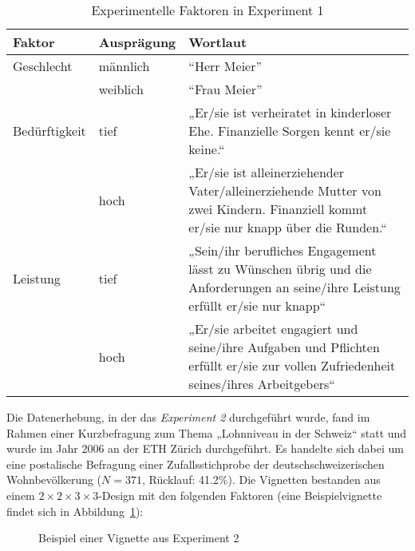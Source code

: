 \documentclass[a4paper,12pt]{article}
\renewcommand{\baselinestretch}{1.1}
\newif\ifcomments
\newcommand{\comment}[1]{%
    \ifcomments\marginpar{\renewcommand{\baselinestretch}{1}\tiny\hspace*{-1.1em}\colorbox{gray!20}%
    {\textcolor{red}{\parbox[t]{.9in}{\raggedright #1}}}}\fi}
\begin{document}
\begin{table}
    \small
    \caption{Experimentelle Faktoren in Experiment 1}\label{tab-ex1-faktoren}
    \begin{tabularx}{\textwidth}{@{}llX@{}}
        \toprule
        Faktor          & Ausprägung & Wortlaut       \\\midrule
        Geschlecht      & männlich     & “Herr Meier”   \\
                        & weiblich     & “Frau Meier”   \\
        \addlinespace
        Bedürftigkeit   & tief         & „Er/sie ist verheiratet in kinderloser Ehe. Finanzielle Sorgen kennt er/sie keine.“ \\
                        & hoch         & „Er/sie ist alleinerziehender Vater/alleinerziehende Mutter von zwei Kindern. Finanziell kommt er/sie nur knapp über die Runden.“ \\
        \addlinespace
        Leistung        & tief         & „Sein/ihr berufliches Engagement lässt zu Wünschen übrig und die Anforderungen an seine/ihre Leistung erfüllt er/sie nur knapp“   \\
                        & hoch         & „Er/sie arbeitet engagiert und seine/ihre Aufgaben und Pflichten erfüllt er/sie zur vollen Zufriedenheit seines/ihres Arbeitgebers“  \\
        \bottomrule
    \end{tabularx}
\end{table}

Die Datenerhebung, in der das \emph{Experiment 2} durchgeführt wurde, fand im Rahmen einer Kurzbefragung zum
Thema „Lohnniveau in der Schweiz“ statt und wurde im Jahr 2006 an der ETH
Zürich durchgeführt. Es handelte sich dabei um eine postalische Befragung einer
Zufallsstichprobe der deutschschweizerischen Wohnbevölkerung ($N = 371$,
Rücklauf: 41.2\%). Die Vignetten bestanden aus einem $2 \times 2 \times 3 \times
3$-Design mit den folgenden Faktoren (eine Beispielvignette findet sich in
Abbildung~\ref{fig-2}): \comment{Tabelle zu Faktoren wie bei Experiment 1}

\begin{figure}\centering
    \caption{Beispiel einer Vignette aus Experiment 2}\label{fig-2}
\end{figure}
\end{document}
